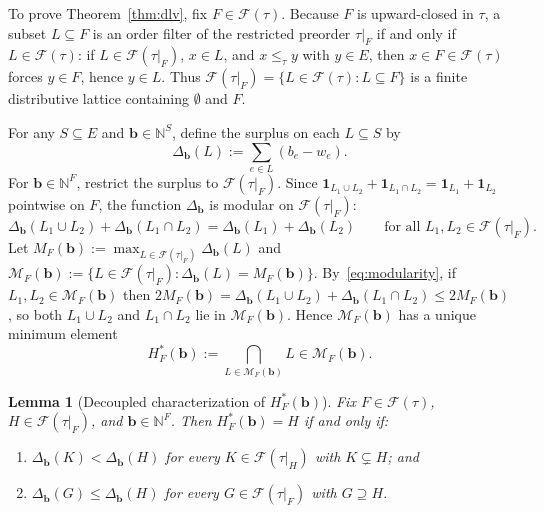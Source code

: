 \documentclass[11pt,letterpaper]{article}
\theoremstyle{result}
\newtheorem{lemma}[theorem]{Lemma}
\theoremstyle{definition}
\theoremstyle{remark}
\newcommand{\NN}{\mathbb{N}}
\newcommand{\fF}{\mathcal{F}}
\newcommand{\mM}{\mathcal{M}}
\begin{document}
To prove Theorem~\ref{thm:dlv}, fix $F\in\fF(\tau)$. Because $F$ is upward-closed in $\tau$, a subset $L\subseteq F$ is an order filter of the restricted preorder $\tau|_F$ if and only if $L\in\fF(\tau)$: if $L\in\fF(\tau|_F)$, $x\in L$, and $x\le_\tau y$ with $y\in E$, then $x\in F\in\fF(\tau)$ forces $y\in F$, hence $y\in L$. Thus $\fF(\tau|_F)=\{L\in\fF(\tau): L\subseteq F\}$ is a finite distributive lattice containing $\emptyset$ and $F$.

For any $S\subseteq E$ and $\mathbf{b}\in\NN^S$, define the surplus on each $L\subseteq S$ by
\[
\Delta_{\mathbf{b}}(L) := \sum_{e\in L} (b_e - w_e).
\]
For $\mathbf{b}\in\NN^F$, restrict the surplus to $\fF(\tau|_F)$. Since $\mathbf{1}_{L_1\cup L_2}+\mathbf{1}_{L_1\cap L_2}=\mathbf{1}_{L_1}+\mathbf{1}_{L_2}$ pointwise on $F$, the function $\Delta_{\mathbf{b}}$ is modular on $\fF(\tau|_F)$:
\begin{equation}\label{eq:modularity}
\Delta_{\mathbf{b}}(L_1\cup L_2) + \Delta_{\mathbf{b}}(L_1\cap L_2) = \Delta_{\mathbf{b}}(L_1) + \Delta_{\mathbf{b}}(L_2)
\qquad\text{for all } L_1, L_2\in\fF(\tau|_F).
\end{equation}
Let $M_F(\mathbf{b}):=\max_{L\in\fF(\tau|_F)}\Delta_{\mathbf{b}}(L)$ and $\mM_F(\mathbf{b}):=\{L\in\fF(\tau|_F):\Delta_{\mathbf{b}}(L)=M_F(\mathbf{b})\}$. By~\eqref{eq:modularity}, if $L_1,L_2\in\mM_F(\mathbf{b})$ then $2M_F(\mathbf{b})=\Delta_{\mathbf{b}}(L_1\cup L_2)+\Delta_{\mathbf{b}}(L_1\cap L_2)\le 2M_F(\mathbf{b})$, so both $L_1\cup L_2$ and $L_1\cap L_2$ lie in $\mM_F(\mathbf{b})$. Hence $\mM_F(\mathbf{b})$ has a unique minimum element
\[
H^*_F(\mathbf{b}) := \bigcap_{L\in\mM_F(\mathbf{b})} L \in \mM_F(\mathbf{b}).
\]

\begin{lemma}[Decoupled characterization of $H^*_F(\mathbf{b})$]\label{lem:decouple}
Fix $F\in\fF(\tau)$, $H\in\fF(\tau|_F)$, and $\mathbf{b}\in\NN^F$. Then $H^*_F(\mathbf{b})=H$ if and only if:
\begin{enumerate}
\item[(i)] $\Delta_{\mathbf{b}}(K) < \Delta_{\mathbf{b}}(H)$ for every $K\in\fF(\tau|_H)$ with $K\subsetneq H$; and
\item[(ii)] $\Delta_{\mathbf{b}}(G) \le \Delta_{\mathbf{b}}(H)$ for every $G\in\fF(\tau|_F)$ with $G\supseteq H$.
\end{enumerate}
\end{lemma}
\end{document}
